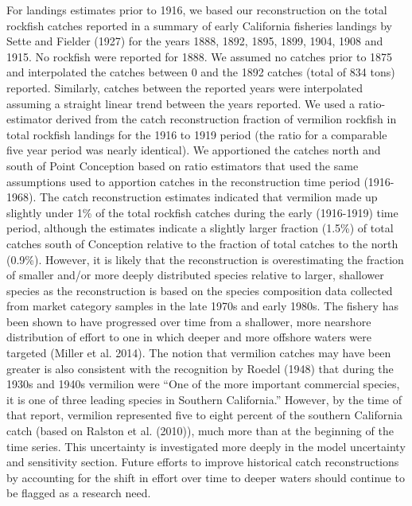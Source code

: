 \documentclass[11pt,
  english,
  a4paper,
]{article}
\begin{document}
For landings estimates prior to 1916, we based our reconstruction on the total rockfish catches reported in a summary of early California fisheries landings by Sette and Fielder {(1927)\leavevmode\tagmcend\tagstructend} for the years 1888, 1892, 1895, 1899, 1904, 1908 and 1915. No rockfish were reported for 1888. We assumed no catches prior to 1875 and interpolated the catches between 0 and the 1892 catches (total of 834 tons) reported. Similarly, catches between the reported years were interpolated assuming a straight linear trend between the years reported. We used a ratio-estimator derived from the catch reconstruction fraction of vermilion rockfish in total rockfish landings for the 1916 to 1919 period (the ratio for a comparable five year period was nearly identical). We apportioned the catches north and south of Point Conception based on ratio estimators that used the same assumptions used to apportion catches in the reconstruction time period (1916-1968). The catch reconstruction estimates indicated that vermilion made up slightly under 1\% of the total rockfish catches during the early (1916-1919) time period, although the estimates indicate a slightly larger fraction (1.5\%) of total catches south of Conception relative to the fraction of total catches to the north (0.9\%). However, it is likely that the reconstruction is overestimating the fraction of smaller and/or more deeply distributed species relative to larger, shallower species as the reconstruction is based on the species composition data collected from market category samples in the late 1970s and early 1980s. The fishery has been shown to have progressed over time from a shallower, more nearshore distribution of effort to one in which deeper and more offshore waters were targeted {(Miller et al. 2014)\leavevmode\tagmcend\tagstructend}. The notion that vermilion catches may have been greater is also consistent with the recognition by Roedel {(1948)\leavevmode\tagmcend\tagstructend} that during the 1930s and 1940s vermilion were ``One of the more important commercial species, it is one of three leading species in Southern California.'' However, by the time of that report, vermilion represented five to eight percent of the southern California catch (based on Ralston et al. {(2010)\leavevmode\tagmcend\tagstructend}), much more than at the beginning of the time series. This uncertainty is investigated more deeply in the model uncertainty and sensitivity section. Future efforts to improve historical catch reconstructions by accounting for the shift in effort over time to deeper waters should continue to be flagged as a research need.
\end{document}

